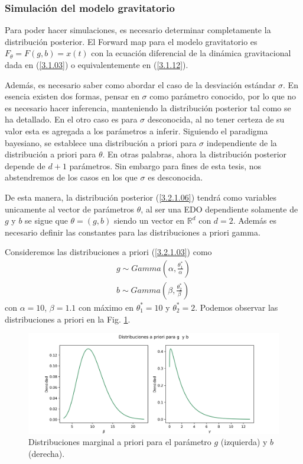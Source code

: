 \subsubsection{Simulación del modelo gravitatorio}

Para poder hacer simulaciones, es necesario determinar completamente la distribución posterior. El Forward map para el modelo gravitatorio es $F_{\theta} = F(g,b) = x(t)$ con la ecuación diferencial de la dinámica gravitacional dada en (\ref{3.1.03}) o equivalentemente en (\ref{3.1.12}). 

Además, es necesario saber como abordar el caso de la desviación estándar $\sigma$. En esencia existen dos formas, pensar en $\sigma$ como parámetro conocido, por lo que no es necesario hacer inferencia, manteniendo la distribución posterior tal como se ha detallado. En el otro caso es para $\sigma$ desconocida, al no tener certeza de su valor esta es agregada a los parámetros a inferir. Siguiendo el paradigma bayesiano, se establece una distribución a priori para $\sigma$ independiente de la distribución a priori para $\theta$. En otras palabras, ahora la distribución posterior depende de $d+1$ parámetros. Sin embargo para fines de esta tesis, nos abstendremos de los casos en los que $\sigma$ es desconocida.

De esta manera, la distribución posterior (\ref{3.2.1.06}) tendrá como variables unicamente al vector de parámetros $\theta$, al ser una EDO dependiente solamente de $g$ y $b$ se sigue que $\theta = (g,b)$ siendo un vector en $\mathbb{R}^{d}$ con $d = 2$. Además es necesario definir las constantes para las distribuciones a priori gamma.

Consideremos las distribuciones a priori (\ref{3.2.1.03}) como
\begin{align}
    g \sim Gamma \left(\alpha, \frac{\theta_1^{*}}{\alpha}\right) \\
    b \sim Gamma \left(\beta, \frac{\theta_2^{*}}{\beta}\right) 
\end{align}
con $\alpha = 10$, $\beta = 1.1$ con máximo en $\theta_1^{*} = 10$ y $\theta_2^{*} = 2$. Podemos observar las distribuciones a priori en la Fig. \ref{Fig. 3.2.2.01}.

\begin{figure}[H] 
    \centering 
    \includegraphics[width = 15 cm]{img/Exp_Central_gravedad_sigma/Figuras/Generales/Apriori_gravedad_sigma.png}
    \caption{Distribuciones marginal a priori para el parámetro $g$ (izquierda) y $b$ (derecha).}
    \label{Fig. 3.2.2.01}
\end{figure} 


